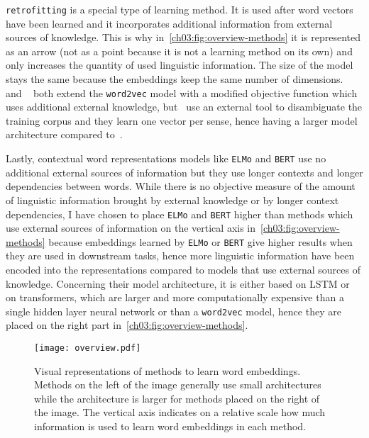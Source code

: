     \texttt{retrofitting} is a special type of learning method. It is used after
    word vectors have been learned and it incorporates additional information
    from external sources of knowledge. This is why
    in~\autoref{ch03:fig:overview-methods} it is represented as an arrow (not as
    a point because it is not a learning method on its own) and only increases
    the quantity of used linguistic information. The size of the model stays the
    same because the embeddings keep the same number of dimensions.
    \citeauthor{yudredze2014improving}~\citep{yudredze2014improving} and
    \citeauthor{iacobacci2015sensembed}~\citep{iacobacci2015sensembed} both
    extend the \texttt{word2vec} model with a modified objective function which
    uses additional external knowledge, but~\citeauthor{iacobacci2015sensembed}
    use an external tool to disambiguate the training corpus and they learn one
    vector per sense, hence having a larger model architecture compared
    to~\citet{yudredze2014improving}. \medskip

    Lastly, contextual word representations models like \texttt{ELMo} and
    \texttt{BERT} use no additional external sources of information but they use
    longer contexts and longer dependencies between words. While there is no
    objective measure of the amount of linguistic information brought by
    external knowledge or by longer context dependencies, I have chosen to place
    \texttt{ELMo} and \texttt{BERT} higher than methods which use external
    sources of information on the vertical axis
    in~\autoref{ch03:fig:overview-methods} because embeddings learned by
    \texttt{ELMo} or \texttt{BERT} give higher results when they are used in
    downstream tasks, hence more linguistic information have been encoded into
    the representations compared to models that use external sources of
    knowledge. Concerning their model architecture, it is either based on LSTM
    or on transformers, which are larger and more computationally expensive than
    a single hidden layer neural network or than a \texttt{word2vec} model,
    hence they are placed on the right part
    in~\autoref{ch03:fig:overview-methods}.

    \begin{figure}[h]
      \centering
      \texttt{[image: overview.pdf]}
      \caption[Visual representations of methods to learn word embeddings.]
      {Visual representations of methods to learn word embeddings. Methods on
      the left of the image generally use small architectures while the
      architecture is larger for methods placed on the right of the image. The
      vertical axis indicates on a relative scale how much information is used
      to learn word embeddings in each method.}
      \label{ch03:fig:overview-methods}
    \end{figure}

